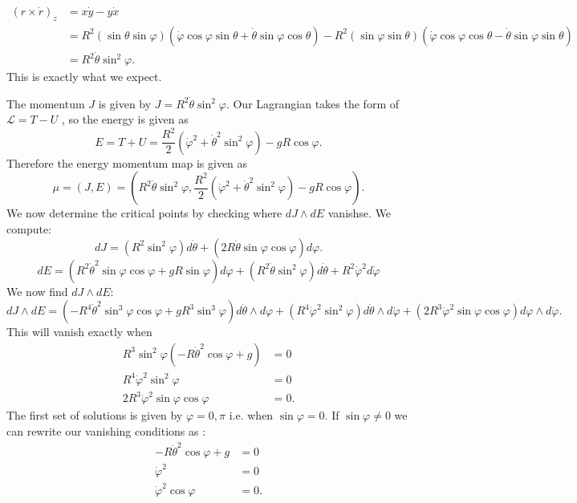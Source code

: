 \documentclass[12pt, a4paper]{article}
\theoremstyle{definition}
\newcommand{\eL}{\mathcal{L}}                         %
\begin{document}
\begin{align*} (r \times \dot{r})_z  &= x \dot{y} - y \dot{x} 
	\\ &=  R^2 \left( \sin \theta \sin \varphi \right) \left( \dot{\varphi} \cos \varphi \sin \theta + \dot{\theta} \sin \varphi \cos \theta \right)- R^2\left( \sin \varphi \sin \theta \right) \left( \dot{\varphi} \cos \varphi \cos \theta - \dot{\theta} \sin \varphi \sin \theta \right)
	\\ & = R^2 \dot{\theta} \sin^2 \varphi.
\end{align*}
This is exactly what we expect. 
\item The momentum $J$ is given by $J  = R^2 \dot{\theta} \sin^2 \varphi$. Our Lagrangian takes the form of $\eL = T - U$ , so the energy is given as 
	$$ E = T+U = \frac{ R^2 }{ 2 } \left( \dot{\varphi}^2 + \dot{\theta}^2 \sin^2 \varphi \right)- gR \cos \varphi. $$ 
	Therefore the energy momentum map is given as 
	$$ \mu = (J,E) = \left( R^2 \dot{\theta} \sin^2 \varphi, \frac{ R^2 }{ 2 } \left( \dot{\varphi}^2 + \dot{\theta}^2 \sin^2 \varphi \right) - gR \cos \varphi \right). $$ 
We now determine the critical points by checking where $dJ \wedge dE $ vanishse. We compute: 
$$ dJ = \left(R^2 \sin^2 \varphi \right) d \dot{\theta} +  \left(2 R \dot{\theta } \sin \varphi \cos \varphi \right)d \varphi.$$ 
$$ dE = \left( R^2 \dot{\theta}^2 \sin \varphi \cos \varphi + gR \sin \varphi \right)d\varphi + \left( R^2 \dot{\theta} \sin^2 \varphi \right)d\dot{\theta} +  R^2 \dot{\varphi}^2 d\dot{\varphi} $$
We now find $dJ \wedge dE$:
$$ dJ \wedge dE = \left( -R^4 \dot{\theta}^2 \sin^3 \varphi \cos \varphi + gR^3 \sin^3 \varphi \right) d \dot{\theta} \wedge d \varphi  + \left(   R^4 \dot{\varphi}^2 \sin^2 \varphi\right)d \dot{\theta} \wedge d \dot{\varphi} + \left( 2R^3 \dot{\varphi}^2 \sin\varphi \cos \varphi \right)d\varphi \wedge d \dot{\varphi}.$$ 
This will vanish exactly when 
\begin{align*}
	R^3 \sin^2 \varphi \left( - R \dot{\theta}^2 \cos \varphi + g \right)& = 0
	\\ R^4 \dot{\varphi}^2 \sin^2 \varphi & = 0
	\\ 2R^3 \dot{\varphi}^2 \sin \varphi \cos \varphi & =0.
\end{align*}
The first set of solutions is given by $\varphi = 0 , \pi$ i.e. when $\sin \varphi = 0$. If $\sin \varphi \neq 0$ we can rewrite our vanishing conditions as :
\begin{align*}
	-R \dot{\theta}^2 \cos \varphi + g &= 0
	\\ \dot{\varphi}^2 & = 0
	\\ \dot{\varphi}^2 \cos \varphi & =0.
\end{align*}
\end{document}

